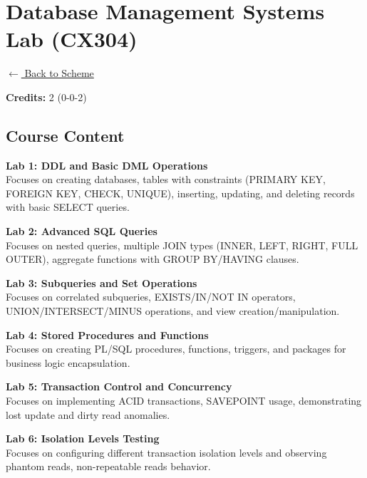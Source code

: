 \section*{Database Management Systems Lab (CX304)}
\label{course:CX304}

\noindent \small{\hyperref[main:scheme]{$\leftarrow$ Back to Scheme}} \vspace{0.5cm}

\noindent \textbf{Credits:} 2 (0-0-2)

\subsection*{Course Content}
\noindent\textbf{Lab 1: DDL and Basic DML Operations} \\
Focuses on creating databases, tables with constraints (PRIMARY KEY, FOREIGN KEY, CHECK, UNIQUE), inserting, updating, and deleting records with basic SELECT queries.

\vspace{0.2cm}

\noindent\textbf{Lab 2: Advanced SQL Queries} \\
Focuses on nested queries, multiple JOIN types (INNER, LEFT, RIGHT, FULL OUTER), aggregate functions with GROUP BY/HAVING clauses.

\vspace{0.2cm}

\noindent\textbf{Lab 3: Subqueries and Set Operations} \\
Focuses on correlated subqueries, EXISTS/IN/NOT IN operators, UNION/INTERSECT/MINUS operations, and view creation/manipulation.

\vspace{0.2cm}

\noindent\textbf{Lab 4: Stored Procedures and Functions} \\
Focuses on creating PL/SQL procedures, functions, triggers, and packages for business logic encapsulation.

\vspace{0.2cm}

\noindent\textbf{Lab 5: Transaction Control and Concurrency} \\
Focuses on implementing ACID transactions, SAVEPOINT usage, demonstrating lost update and dirty read anomalies.

\vspace{0.2cm}

\noindent\textbf{Lab 6: Isolation Levels Testing} \\
Focuses on configuring different transaction isolation levels and observing phantom reads, non-repeatable reads behavior.

